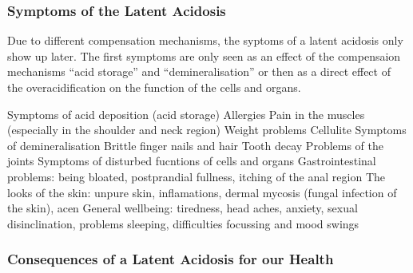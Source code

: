 \documentclass[../main.tex]{subfiles}
\begin{document}
\subsubsection{Symptoms of the Latent Acidosis}

Due to different compensation mechanisms, the syptoms of a latent acidosis only show up later.
The first symptoms are only seen as an effect of the compensaion mechanisms ``acid storage'' and ``demineralisation''
or then as a direct effect of the overacidification on the function of the cells and organs.

\begin{outline}
  \1 Symptoms of acid deposition (acid storage)
  \2 Allergies
  \2 Pain in the muscles (especially in the shoulder and neck region)
  \2 Weight problems
  \2 Cellulite
  \1Symptoms of demineralisation
  \2 Brittle finger nails and hair
  \2 Tooth decay
  \2 Problems of the joints
  \1 Symptoms of disturbed fucntions of cells and organs
  \2 Gastrointestinal problems: being bloated, postprandial fullness,
  itching of the anal region
  \2 The looks of the skin: unpure skin, inflamations, dermal mycosis (fungal infection of the skin),
  acen
  \2 General wellbeing: tiredness, head aches, anxiety,
  sexual disinclination, problems sleeping, difficulties focussing
  and mood swings
  \end{outline}

  \subsubsection{Consequences of a Latent Acidosis for our Health}
  
\end{document}

